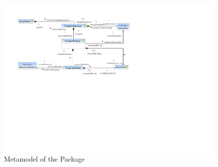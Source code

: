 %
%

\begin{figure}[htb]
  \centering
  \includegraphics[width=\textwidth]{figures/A_technical-reference/packages/storydiagrams_templates/sdm-templates}
  \caption{Metamodel of the  Package}
  \label{fig:MM:templates}
\end{figure}
